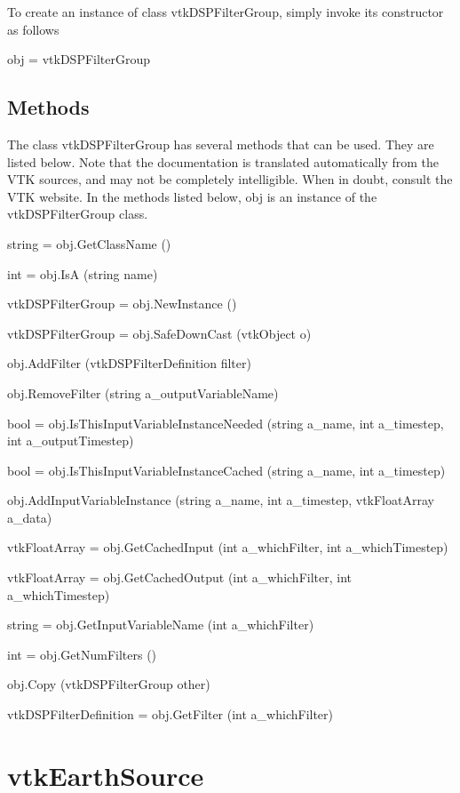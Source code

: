 To create an instance of class vtk\-D\-S\-P\-Filter\-Group, simply invoke its constructor as follows \begin{DoxyVerb}  obj = vtkDSPFilterGroup
\end{DoxyVerb}
 \hypertarget{vtkwidgets_vtkxyplotwidget_Methods}{}\subsection{Methods}\label{vtkwidgets_vtkxyplotwidget_Methods}
The class vtk\-D\-S\-P\-Filter\-Group has several methods that can be used. They are listed below. Note that the documentation is translated automatically from the V\-T\-K sources, and may not be completely intelligible. When in doubt, consult the V\-T\-K website. In the methods listed below, {\ttfamily obj} is an instance of the vtk\-D\-S\-P\-Filter\-Group class. 
\begin{DoxyItemize}
\item {\ttfamily string = obj.\-Get\-Class\-Name ()}  
\item {\ttfamily int = obj.\-Is\-A (string name)}  
\item {\ttfamily vtk\-D\-S\-P\-Filter\-Group = obj.\-New\-Instance ()}  
\item {\ttfamily vtk\-D\-S\-P\-Filter\-Group = obj.\-Safe\-Down\-Cast (vtk\-Object o)}  
\item {\ttfamily obj.\-Add\-Filter (vtk\-D\-S\-P\-Filter\-Definition filter)}  
\item {\ttfamily obj.\-Remove\-Filter (string a\-\_\-output\-Variable\-Name)}  
\item {\ttfamily bool = obj.\-Is\-This\-Input\-Variable\-Instance\-Needed (string a\-\_\-name, int a\-\_\-timestep, int a\-\_\-output\-Timestep)}  
\item {\ttfamily bool = obj.\-Is\-This\-Input\-Variable\-Instance\-Cached (string a\-\_\-name, int a\-\_\-timestep)}  
\item {\ttfamily obj.\-Add\-Input\-Variable\-Instance (string a\-\_\-name, int a\-\_\-timestep, vtk\-Float\-Array a\-\_\-data)}  
\item {\ttfamily vtk\-Float\-Array = obj.\-Get\-Cached\-Input (int a\-\_\-which\-Filter, int a\-\_\-which\-Timestep)}  
\item {\ttfamily vtk\-Float\-Array = obj.\-Get\-Cached\-Output (int a\-\_\-which\-Filter, int a\-\_\-which\-Timestep)}  
\item {\ttfamily string = obj.\-Get\-Input\-Variable\-Name (int a\-\_\-which\-Filter)}  
\item {\ttfamily int = obj.\-Get\-Num\-Filters ()}  
\item {\ttfamily obj.\-Copy (vtk\-D\-S\-P\-Filter\-Group other)}  
\item {\ttfamily vtk\-D\-S\-P\-Filter\-Definition = obj.\-Get\-Filter (int a\-\_\-which\-Filter)}  
\end{DoxyItemize}\hypertarget{vtkhybrid_vtkearthsource}{}\section{vtk\-Earth\-Source}\label{vtkhybrid_vtkearthsource}
